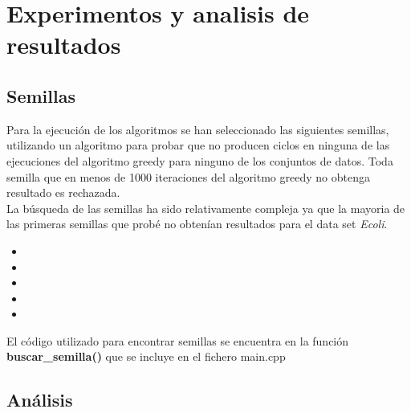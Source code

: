 \chapter{Experimentos y analisis de resultados}
\section{Semillas}
Para la ejecución de los algoritmos se han seleccionado las siguientes semillas, utilizando un algoritmo para probar que no producen ciclos en ninguna de las ejecuciones del algoritmo greedy para ninguno de los conjuntos de datos. Toda semilla que en menos de 1000 iteraciones del algoritmo greedy no obtenga resultado es rechazada. \\
La búsqueda de las semillas ha sido relativamente compleja ya que la mayoria de las primeras semillas que probé no obtenían resultados para el data set \emph{Ecoli}.
\begin{itemize}
   \item
   \item
   \item
   \item
   \item
\end{itemize}

El código utilizado para encontrar semillas se encuentra en la función \textbf{buscar\_semilla()} que se incluye en el fichero main.cpp


\section{Análisis}
